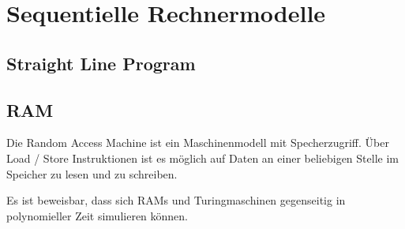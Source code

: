 \section{Sequentielle Rechnermodelle}

\subsection{Straight Line Program}

\subsection{RAM}
Die Random Access Machine ist ein Maschinenmodell mit Specherzugriff. Über Load / Store Instruktionen ist es möglich auf Daten an einer beliebigen Stelle im Speicher zu lesen und zu schreiben.

Es ist beweisbar, dass sich RAMs und Turingmaschinen gegenseitig in polynomieller Zeit simulieren können.
